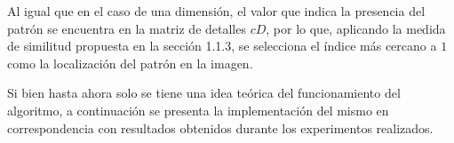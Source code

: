 \par Al igual que en el caso de una dimensi\'on, el valor que indica la presencia del patr\'on se encuentra en la matriz de detalles $cD$, por lo que, aplicando la medida de similitud propuesta en la secci\'on 1.1.3, se selecciona el \'indice m\'as cercano a $1$ como la localizaci\'on del patr\'on en la imagen.\\

\par Si bien hasta ahora solo se tiene una idea te\'orica del funcionamiento del algoritmo, a continuaci\'on se presenta la implementaci\'on del mismo en correspondencia con resultados obtenidos durante los experimentos realizados.